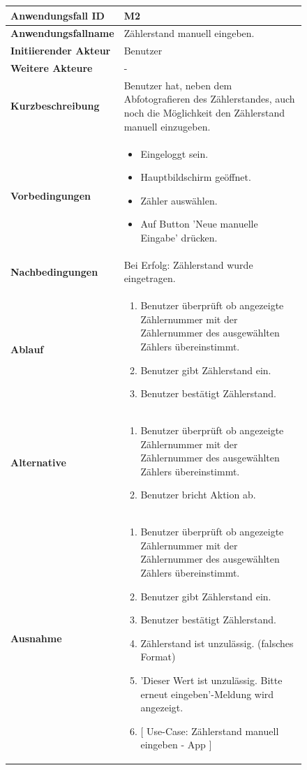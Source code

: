 \newpage

\begin{figure}[H]
	\centering
	\begin{tabularx}{\textwidth}{ X | X }
		\textbf{Anwendungsfall ID} & M2 \\ \hline
		\textbf{Anwendungsfallname} & Zählerstand manuell eingeben. \\ \hline
		\textbf{Initiierender Akteur} & Benutzer \\ \hline
		\textbf{Weitere Akteure} & - \\ \hline
		\textbf{Kurzbeschreibung} & Benutzer hat, neben dem Abfotografieren des Zählerstandes, auch noch die Möglichkeit den Zählerstand manuell einzugeben.  \\ \hline
		\textbf{Vorbedingungen} & 
		\begin {itemize}
			\item Eingeloggt sein. 
			\item Hauptbildschirm geöffnet.
			\item Zähler auswählen.
			\item Auf Button 'Neue manuelle Eingabe' drücken.
		\end{itemize}\\ \hline
		\textbf{Nachbedingungen} & Bei Erfolg: Zählerstand wurde eingetragen.  \\ \hline
		\textbf{Ablauf} &
		\begin{enumerate}
			\item Benutzer überprüft ob angezeigte Zählernummer mit der Zählernummer des ausgewählten Zählers übereinstimmt.
			\item Benutzer gibt Zählerstand ein.
			\item Benutzer bestätigt Zählerstand.
		\end{enumerate} \\ \hline
		\textbf{Alternative} &
		\begin{enumerate}
			\item Benutzer überprüft ob angezeigte Zählernummer mit der Zählernummer des ausgewählten Zählers übereinstimmt.
			\item Benutzer bricht Aktion ab.
		\end{enumerate} \\ \hline
		\textbf{Ausnahme} &
		\begin{enumerate}
			\item Benutzer überprüft ob angezeigte Zählernummer mit der Zählernummer des ausgewählten Zählers übereinstimmt.
			\item Benutzer gibt Zählerstand ein.
			\item Benutzer bestätigt Zählerstand.
			\item Zählerstand ist unzulässig. (falsches Format)

			\item 'Dieser Wert ist unzulässig. Bitte erneut eingeben'-Meldung wird angezeigt. 
 			\item $\lbrack$ Use-Case: Zählerstand manuell eingeben - App $\rbrack$
		\end{enumerate} \\


	\end{tabularx}
\end{figure}

